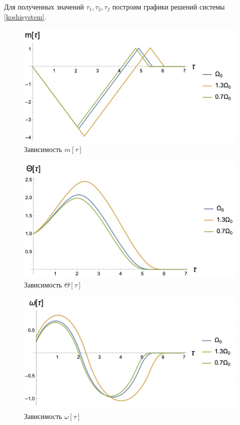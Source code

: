 \documentclass[a4paper,14pt]{article}
\theoremstyle{plain} %
\theoremstyle{definition} %
\theoremstyle{remark} %
\begin{document}
{Для полученных значений $\tau_1,\tau_2,\tau_f$ построим графики решений системы \eqref{koshisystem}.
\begin{figure}[h!]
    \centering
    \includegraphics[width=0.7\linewidth]{m.jpeg}
    \caption{Зависимость $m[\tau]$}
    \label{fig:m}
\end{figure}
\begin{figure}[h!]
    \centering
    \includegraphics[width=0.7\linewidth]{theta.jpeg}
    \caption{Зависимость $\Theta[\tau]$}
    \label{fig:theta}
\end{figure}
\begin{figure}[h!]
    \centering
    \includegraphics[width=0.7\linewidth]{omega.jpeg}
    \caption{Зависимость $\omega[\tau]$}
    \label{fig:omega}
\end{figure}


\newpage
}
\end{document}
